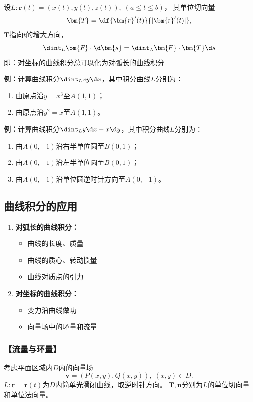 设$L:\bm{r}(t)=(x(t),y(t),z(t)),\;(a\leq t\leq b)$， 其单位切向量
$$\bm{T}=\df{\bm{r}'(t)}{|\bm{r}'(t)|},$$
$\bm{T}$指向$t$的增大方向，
$${\dint_L\bm{F}\cdot \d\bm{s}=\dint_L\bm{F}\cdot\bm{T}\d s}$$
即：{对坐标的曲线积分总可以化为对弧长的曲线积分}
 
{\bf 例：}计算曲线积分$\dint_Lxy\d x$，其中积分曲线$L$分别为：
\begin{enumerate}[(1)]
  \setlength{\itemindent}{1cm}
  \item 由原点沿$y=x^3$至$A(1,1)$；
  \item 由原点沿$y^2=x$至$A(1,1)$。
\end{enumerate}

{\bf 例：}计算曲线积分$\dint_Ly\d x-x\d y$，其中积分曲线$L$分别为：
\begin{enumerate}[(1)]
  \setlength{\itemindent}{1cm}
  \item 由$A(0,-1)$沿右半单位圆至$B(0,1)$；
  \item 由$A(0,-1)$沿左半单位圆至$B(0,1)$；
  \item 由$A(0,-1)$沿单位圆逆时针方向至$A(0,-1)$。
\end{enumerate}

\subsection{曲线积分的应用}

\begin{enumerate}
  \item {\bf 对弧长的曲线积分：}
  \begin{itemize}
    \item 曲线的长度、质量
    \item 曲线的质心、转动惯量
    \item 曲线对质点的引力
  \end{itemize}
  \item {\bf 对坐标的曲线积分：}
  \begin{itemize}
    \item 变力沿曲线做功
    \item {向量场中的环量和流量}
  \end{itemize}
\end{enumerate}

\subsubsection{【流量与环量】}

考虑平面区域内$D$内的向量场
$$\bm{v}=(P(x,y),Q(x,y)),\;(x,y)\in D.$$
$L:\bm{r}=\bm{r}(t)$为$D$内简单光滑闭曲线，取逆时针方向。
$\bm{T},\bm{n}$分别为$L$的单位切向量和单位法向量。

